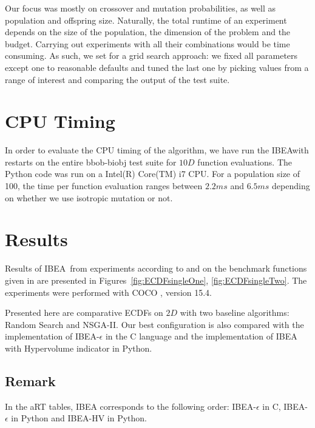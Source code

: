\documentclass{sig-alternate}
\newcommand{\algname}{IBEA}
\begin{document}
Our focus was mostly on crossover and mutation probabilities, as well as population and offspring size. Naturally, the total runtime of an experiment depends on the size of the population, the dimension of the problem and the budget. Carrying out experiments with all their combinations would be time consuming. As such, we set for a grid search approach: we fixed all parameters except one to reasonable defaults and tuned the last one by picking values from a range of interest and comparing the output of the test suite.

\section{CPU Timing}
In order to evaluate the CPU timing of the algorithm, we have run the \algname with restarts on the entire bbob-biobj test suite \cite{biobj2016func} for $10 D$ function evaluations. The Python code was run on a Intel(R) Core(TM) i7 CPU. For a population size of 100, the time per function evaluation ranges between $2.2ms$ and $6.5ms$ depending on whether we use isotropic mutation or not.  


\section{Results}

Results of \algname\ from experiments according to \cite{hansen2016exp} and \cite{brockhoff2016biobjective} on the benchmark
functions given in \cite{biobj2016func} are presented in
Figures~\ref{fig:ECDFsingleOne}, \ref{fig:ECDFsingleTwo}. The experiments were performed with COCO \cite{hansen2016cocoplat}, version 15.4.

Presented here are comparative ECDFs on $2 D$ with two baseline algorithms: Random Search and NSGA-II. Our best configuration is also compared with the implementation of IBEA-$\epsilon$ in the C language and the implementation of IBEA with Hypervolume indicator in Python.

\subsection*{Remark}
In the aRT tables, IBEA corresponds to the following order: IBEA-$\epsilon$ in C, IBEA-$\epsilon$ in Python and IBEA-HV in Python.
\end{document}
